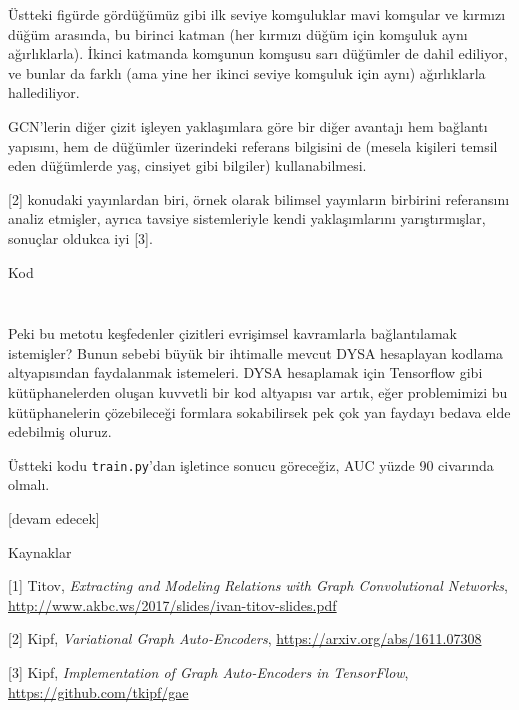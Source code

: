 \documentclass[12pt,fleqn]{article}\usepackage{../../common}
\begin{document}
Üstteki figürde gördüğümüz gibi ilk seviye komşuluklar mavi komşular ve
kırmızı düğüm arasında, bu birinci katman (her kırmızı düğüm için komşuluk
aynı ağırlıklarla). İkinci katmanda komşunun komşusu sarı düğümler de dahil
ediliyor, ve bunlar da farklı (ama yine her ikinci seviye komşuluk için
aynı) ağırlıklarla hallediliyor.

GCN'lerin diğer çizit işleyen yaklaşımlara göre bir diğer avantajı hem
bağlantı yapısını, hem de düğümler üzerindeki referans bilgisini de (mesela
kişileri temsil eden düğümlerde yaş, cinsiyet gibi bilgiler)
kullanabilmesi. 

[2] konudaki yayınlardan biri, örnek olarak bilimsel yayınların
birbirini referansını analiz etmişler, ayrıca tavsiye sistemleriyle kendi
yaklaşımlarını yarıştırmışlar, sonuçlar oldukca iyi [3].

Kod

\inputminted[fontsize=\footnotesize]{python}{util.py}

\inputminted[fontsize=\footnotesize]{python}{train.py}

Peki bu metotu keşfedenler çizitleri evrişimsel kavramlarla bağlantılamak
istemişler? Bunun sebebi büyük bir ihtimalle mevcut DYSA hesaplayan kodlama
altyapısından faydalanmak istemeleri. DYSA hesaplamak için Tensorflow gibi
kütüphanelerden oluşan kuvvetli bir kod altyapısı var artık, eğer
problemimizi bu kütüphanelerin çözebileceği formlara sokabilirsek pek çok
yan faydayı bedava elde edebilmiş oluruz. 

Üstteki kodu \verb!train.py!'dan işletince sonucu göreceğiz, AUC yüzde 90
civarında olmalı.

[devam edecek]

Kaynaklar

[1] Titov, {\em Extracting and Modeling Relations with Graph Convolutional Networks}, \url{http://www.akbc.ws/2017/slides/ivan-titov-slides.pdf}

[2] Kipf, {\em Variational Graph Auto-Encoders}, \url{https://arxiv.org/abs/1611.07308}

[3] Kipf, {\em Implementation of Graph Auto-Encoders in TensorFlow}, \url{https://github.com/tkipf/gae}
\end{document}
